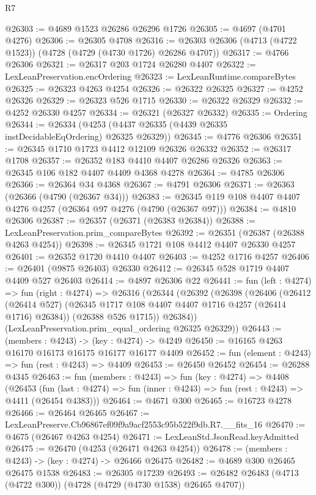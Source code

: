 \begin{lexlean}{R7}
\begin{coremodule}
@26303 := @4689 @1523 @26286 @26296 @1726
@26305 := @4697 (@4701 @4276)
@26306 := @26305 @4708
@26316 := @26303 @26306 (@4713 (@4722 @1523)) (@4728 (@4729 (@4730 @1726) @26286 @4707))
@26317 := @4766 @26306
@26321 := @26317 @203 @1724 @26280 @4407
@26322 := LexLeanPreservation.encOrdering
@26323 := LexLeanRuntime.compareBytes
@26325 := @26323 @4263 @4254
@26326 := @26322 @26325
@26327 := @4252 @26326
@26329 := @26323 @526 @1715
@26330 := @26322 @26329
@26332 := @4252 @26330 @4257
@26334 := @26321 (@26327 @26332)
@26335 := Ordering
@26344 := @26334 (@4253 (@4437 @26335 (@4439 @26335 instDecidableEqOrdering) @26325 @26329))
@26345 := @4776 @26306
@26351 := @26345 @1710 @1723 @4412 @12109 @26326 @26332
@26352 := @26317 @1708
@26357 := @26352 @183 @4410 @4407 @26286 @26326
@26363 := @26345 @106 @182 @4407 @4409 @4368 @4278
@26364 := @4785 @26306
@26366 := @26364 @34 @4368
@26367 := @4791 @26306
@26371 := @26363 (@26366 (@4790 (@26367 @34)))
@26383 := @26345 @119 @108 @4407 @4407 @4276 @4257 (@26364 @97 @4276 (@4790 (@26367 @97)))
@26384 := @4810 @26306
@26387 := @26357 (@26371 (@26383 @26384))
@26388 := LexLeanPreservation.prim_compareBytes
@26392 := @26351 (@26387 (@26388 @4263 @4254))
@26398 := @26345 @1721 @108 @4412 @4407 @26330 @4257
@26401 := @26352 @1720 @4410 @4407
@26403 := @4252 @1716 @4257
@26406 := @26401 (@9875 @26403) @26330
@26412 := @26345 @528 @1719 @4407 @4409 @527 @26403
@26414 := @4897 @26306 @22
@26441 := fun (left : @4274) =>
  fun (right : @4274) =>
  @26316
    (@26344
      (@26392
        (@26398
          (@26406
            (@26412 (@26414 @527) (@26345 @1717 @108 @4407 @4407 @1716 @4257 (@26414 @1716) @26384))
            (@26388 @526 @1715))
          @26384))
      (LexLeanPreservation.prim_equal_ordering @26325 @26329))
@26443 := (members : @4243) -> (key : @4274) -> @4249
@26450 := @16165 @4263 @16170 @16173 @16175 @16177 @16177 @4409
@26452 := fun (element : @4243) => fun (rest : @4243) => @4409
@26453 := @26450 @26452
@26454 := @26288 @4345
@26463 := fun (members : @4243) =>
  fun (key : @4274) =>
  @4408
    (@26453
      (fun (last : @4274) => fun (inner : @4243) => fun (rest : @4243) => @4411 (@26454 @4383)))
@26464 := @4671 @300
@26465 := @16723 @4278
@26466 := @26464 @26465
@26467 := LexLeanPreserve.Cb96867ef09f9a9acf2553c95b522f9db.R7.__fits_16
@26470 := @4675 (@26467 @4263 @4254)
@26471 := LexLeanStd.JsonRead.keyAdmitted
@26475 := @26470 (@4253 (@26471 @4263 @4254))
@26478 := (members : @4243) -> (key : @4274) -> @26466 @26475
@26482 := @4689 @300 @26465 @26475 @1538
@26483 := @26305 @17239
@26493 := @26482 @26483 (@4713 (@4722 @300)) (@4728 (@4729 (@4730 @1538) @26465 @4707))

\end{coremodule}
\end{lexlean}
